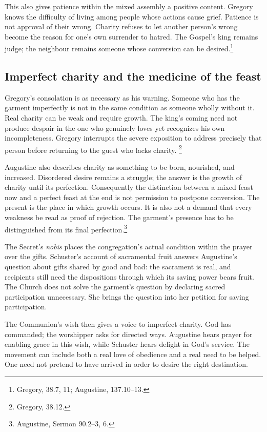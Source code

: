This also gives patience within the mixed assembly a positive
content. Gregory knows the difficulty of living among people
whose actions cause grief. Patience is not approval of their
wrong. Charity refuses to let another person's wrong become the
reason for one's own surrender to hatred. The Gospel's king
remains judge; the neighbour remains someone whose conversion
can be desired.\footnote{Gregory,  38.7,
11; Augustine,  137.10--13.}

\subsection{Imperfect charity and the medicine of the feast}

Gregory's consolation is as necessary as his warning. Someone
who has the garment imperfectly is not in the same condition as
someone wholly without it. Real charity can be weak and require
growth. The king's coming need not produce despair in the one
who genuinely loves yet recognizes his own incompleteness.
Gregory interrupts the severe exposition to address precisely
that person before returning to the guest who lacks charity.
\footnote{Gregory,  38.12.}

Augustine also describes charity as something to be born,
nourished, and increased. Disordered desire remains a struggle;
the answer is the growth of charity until its perfection.
Consequently the distinction between a mixed feast now and a
perfect feast at the end is not permission to postpone conversion.
The present is the place in which growth occurs. It is also not
a demand that every weakness be read as proof of rejection.
The garment's presence has to be distinguished from its final
perfection.\footnote{Augustine, Sermon 90.2--3, 6.}

The Secret's \textit{nobis} places the congregation's actual
condition within the prayer over the gifts. Schuster's account
of sacramental fruit answers Augustine's question about gifts
shared by good and bad: the sacrament is real, and recipients
still need the dispositions through which its saving power
bears fruit. The Church does not solve the garment's question
by declaring sacred participation unnecessary. She brings the
question into her petition for saving participation.

The Communion's wish then gives a voice to imperfect charity.
God has commanded; the worshipper asks for directed ways.
Augustine hears prayer for enabling grace in this wish, while
Schuster hears delight in God's service. The movement can
include both a real love of obedience and a real need to be
helped. One need not pretend to have arrived in order to desire
the right destination.

